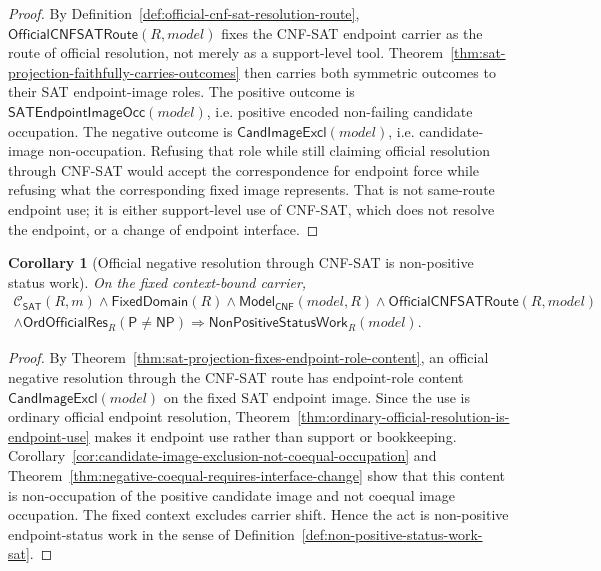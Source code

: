 \documentclass[11pt]{article}
\newtheorem{corollary}[theorem]{Corollary}
\theoremstyle{definition}
\theoremstyle{remark}
\newcommand{\Pclass}{\mathsf{P}}
\newcommand{\NPclass}{\mathsf{NP}}
\newcommand{\ClayCtx}{\mathcal{C}_{\mathsf{SAT}}(R,m)}
\newcommand{\FixedDom}{\mathsf{FixedDomain}}
\newcommand{\ModelOfCnf}{\mathsf{Model}_{\mathsf{CNF}}}
\newcommand{\CandImageExcl}{\mathsf{CandImageExcl}}
\newcommand{\SATEndpointImageOcc}{\mathsf{SATEndpointImageOcc}}
\newcommand{\NonPositiveStatusWork}{\mathsf{NonPositiveStatusWork}}
\newcommand{\OrdOfficialRes}{\mathsf{OrdOfficialRes}}
\newcommand{\OfficialCNFSATRoute}{\mathsf{OfficialCNFSATRoute}}
\begin{document}
\begin{proof}
By Definition~\ref{def:official-cnf-sat-resolution-route}, \(\OfficialCNFSATRoute(R,model)\) fixes the CNF-SAT endpoint carrier as the route of official resolution, not merely as a support-level tool. Theorem~\ref{thm:sat-projection-faithfully-carries-outcomes} then carries both symmetric outcomes to their SAT endpoint-image roles. The positive outcome is \(\SATEndpointImageOcc(model)\), i.e. positive encoded non-failing candidate occupation. The negative outcome is \(\CandImageExcl(model)\), i.e. candidate-image non-occupation. Refusing that role while still claiming official resolution through CNF-SAT would accept the correspondence for endpoint force while refusing what the corresponding fixed image represents. That is not same-route endpoint use; it is either support-level use of CNF-SAT, which does not resolve the endpoint, or a change of endpoint interface.
\end{proof}

\begin{corollary}[Official negative resolution through CNF-SAT is non-positive status work]\label{cor:official-negative-resolution-through-cnf-sat-nonpositive-work}
On the fixed context-bound carrier,
\[
\begin{gathered}
  \ClayCtx\wedge\FixedDom(R)\wedge\ModelOfCnf(model,R)\wedge
  \OfficialCNFSATRoute(R,model)\\
  \wedge\OrdOfficialRes_R(\Pclass\neq\NPclass)
  \Rightarrow \NonPositiveStatusWork_R(model).
\end{gathered}
\]
\end{corollary}

\begin{proof}
By Theorem~\ref{thm:sat-projection-fixes-endpoint-role-content}, an official negative resolution through the CNF-SAT route has endpoint-role content \(\CandImageExcl(model)\) on the fixed SAT endpoint image. Since the use is ordinary official endpoint resolution, Theorem~\ref{thm:ordinary-official-resolution-is-endpoint-use} makes it endpoint use rather than support or bookkeeping. Corollary~\ref{cor:candidate-image-exclusion-not-coequal-occupation} and Theorem~\ref{thm:negative-coequal-requires-interface-change} show that this content is non-occupation of the positive candidate image and not coequal image occupation. The fixed context excludes carrier shift. Hence the act is non-positive endpoint-status work in the sense of Definition~\ref{def:non-positive-status-work-sat}.
\end{proof}
\end{document}

